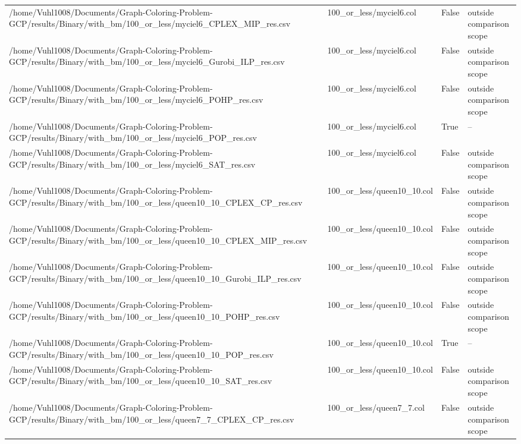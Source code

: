 \begin{table}[htbp]
\begin{tabular}{llll}
/home/Vuhl1008/Documents/Graph-Coloring-Problem-GCP/results/Binary/with\_bm/100\_or\_less/myciel6\_CPLEX\_MIP\_res.csv & 100\_or\_less/myciel6.col & False & outside comparison scope \\
/home/Vuhl1008/Documents/Graph-Coloring-Problem-GCP/results/Binary/with\_bm/100\_or\_less/myciel6\_Gurobi\_ILP\_res.csv & 100\_or\_less/myciel6.col & False & outside comparison scope \\
/home/Vuhl1008/Documents/Graph-Coloring-Problem-GCP/results/Binary/with\_bm/100\_or\_less/myciel6\_POHP\_res.csv & 100\_or\_less/myciel6.col & False & outside comparison scope \\
/home/Vuhl1008/Documents/Graph-Coloring-Problem-GCP/results/Binary/with\_bm/100\_or\_less/myciel6\_POP\_res.csv & 100\_or\_less/myciel6.col & True & -- \\
/home/Vuhl1008/Documents/Graph-Coloring-Problem-GCP/results/Binary/with\_bm/100\_or\_less/myciel6\_SAT\_res.csv & 100\_or\_less/myciel6.col & False & outside comparison scope \\
/home/Vuhl1008/Documents/Graph-Coloring-Problem-GCP/results/Binary/with\_bm/100\_or\_less/queen10\_10\_CPLEX\_CP\_res.csv & 100\_or\_less/queen10\_10.col & False & outside comparison scope \\
/home/Vuhl1008/Documents/Graph-Coloring-Problem-GCP/results/Binary/with\_bm/100\_or\_less/queen10\_10\_CPLEX\_MIP\_res.csv & 100\_or\_less/queen10\_10.col & False & outside comparison scope \\
/home/Vuhl1008/Documents/Graph-Coloring-Problem-GCP/results/Binary/with\_bm/100\_or\_less/queen10\_10\_Gurobi\_ILP\_res.csv & 100\_or\_less/queen10\_10.col & False & outside comparison scope \\
/home/Vuhl1008/Documents/Graph-Coloring-Problem-GCP/results/Binary/with\_bm/100\_or\_less/queen10\_10\_POHP\_res.csv & 100\_or\_less/queen10\_10.col & False & outside comparison scope \\
/home/Vuhl1008/Documents/Graph-Coloring-Problem-GCP/results/Binary/with\_bm/100\_or\_less/queen10\_10\_POP\_res.csv & 100\_or\_less/queen10\_10.col & True & -- \\
/home/Vuhl1008/Documents/Graph-Coloring-Problem-GCP/results/Binary/with\_bm/100\_or\_less/queen10\_10\_SAT\_res.csv & 100\_or\_less/queen10\_10.col & False & outside comparison scope \\
/home/Vuhl1008/Documents/Graph-Coloring-Problem-GCP/results/Binary/with\_bm/100\_or\_less/queen7\_7\_CPLEX\_CP\_res.csv & 100\_or\_less/queen7\_7.col & False & outside comparison scope \\

\end{tabular}
\end{table}
